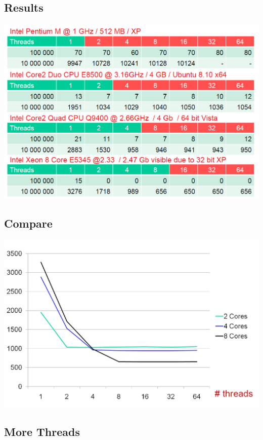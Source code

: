 \subsection*{Results}

\begin{frame}
  \includegraphics[width=\textwidth]{figures/measurement-1}
\end{frame}

\subsection*{Compare}

\begin{frame}
  \includegraphics[width=\textwidth]{figures/measurement-2}
\end{frame}

\subsection*{More Threads}

